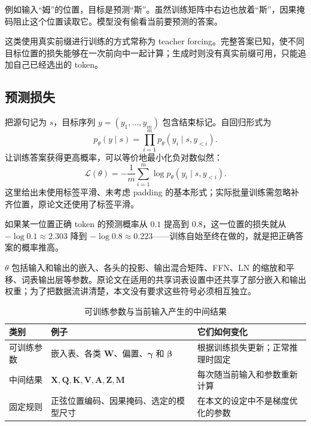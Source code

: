 \documentclass[UTF8,a4paper,12pt]{ctexart}
\numberwithin{equation}{section}
\begin{document}
例如输入``姆''的位置，目标是预测``斯''。虽然训练矩阵中右边也放着``斯''，因果掩码阻止这个位置读取它。模型没有偷看当前要预测的答案。

这类使用真实前缀进行训练的方式常称为 teacher forcing。完整答案已知，使不同目标位置的损失能够在一次前向中一起计算；生成时则没有真实前缀可用，只能追加自己已经选出的 token。

\subsection{预测损失}

把源句记为 $s$，目标序列 $y=(y_1,\ldots,y_m)$ 包含结束标记。自回归形式为
\begin{equation}
p_\theta(y\mid s)=\prod_{i=1}^{m}p_\theta(y_i\mid s,y_{<i}).
\label{eq:autoregressive}
\end{equation}
让训练答案获得更高概率，可以等价地最小化负对数似然：
\begin{equation}
\mathcal L(\theta)
=-\frac1m\sum_{i=1}^{m}\log p_\theta(y_i\mid s,y_{<i}).
\label{eq:crossentropy}
\end{equation}
这里给出未使用标签平滑、未考虑 padding 的基本形式；实际批量训练需忽略补齐位置，原论文还使用了标签平滑。

如果某一位置正确 token 的预测概率从 $0.1$ 提高到 $0.8$，这一位置的损失就从 $-\log0.1\approx2.303$ 降到 $-\log0.8\approx0.223$——训练自始至终在做的，就是把正确答案的概率推高。

$\theta$ 包括输入和输出的嵌入、各头的投影、输出混合矩阵、FFN、LN 的缩放和平移、词表输出层等参数。原论文在适用的共享词表设置中还共享了部分嵌入和输出权重；为了把数据流讲清楚，本文没有要求这些符号必须相互独立。

\begin{table}[htbp]
\centering
\caption{可训练参数与当前输入产生的中间结果}
\label{tab:parameters}
\renewcommand{\arraystretch}{1.25}
\begin{tabularx}{\textwidth}{@{}p{2.6cm}Y Y@{}}
\toprule
类别 & 例子 & 它们如何变化\\
\midrule
可训练参数 & 嵌入表、各类 $\bm W$、偏置、$\bm\gamma$ 和 $\bm\beta$ & 根据训练损失更新；正常推理时固定\\
中间结果 & $\bm X,\bm Q,\bm K,\bm V,\bm A,\bm Z,\bm M$ & 每次随当前输入和参数重新计算\\
固定规则 & 正弦位置编码、因果掩码、选定的模型尺寸 & 在本文的设定中不是梯度优化的参数\\
\bottomrule
\end{tabularx}
\end{table}
\end{document}
